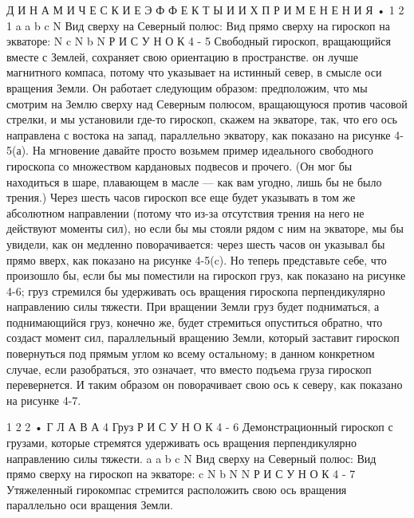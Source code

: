 \documentclass[10pt,oneside]{article}
\begin{document}
Д И Н А М И Ч Е С К И Е  Э Ф Ф Е К Т Ы  И  И Х  П Р И М Е Н Е Н И Я • 1 2 1 a a b c N Вид сверху на Северный полюс: Вид прямо сверху на гироскоп на экваторе: N c N b N Р И С У Н О К  4 - 5 Свободный гироскоп, вращающийся вместе с Землей, сохраняет свою ориентацию в пространстве. он лучше магнитного компаса, потому что указывает на истинный север, в смысле оси вращения Земли. Он работает следующим образом: предположим, что мы смотрим на Землю сверху над Северным полюсом, вращающуюся против часовой стрелки, и мы установили где-то гироскоп, скажем на экваторе, так, что его ось направлена с востока на запад, параллельно экватору, как показано на рисунке 4-5(а). На мгновение давайте просто возьмем пример идеального свободного гироскопа со множеством кардановых подвесов и прочего. (Он мог бы находиться в шаре, плавающем в масле --- как вам угодно, лишь бы не было трения.) Через шесть часов гироскоп все еще будет указывать в том же абсолютном направлении (потому что из-за отсутствия трения на него не действуют моменты сил), но если бы мы стояли рядом с ним на экваторе, мы бы увидели, как он медленно поворачивается: через шесть часов он указывал бы прямо вверх, как показано на рисунке 4-5(c). Но теперь представьте себе, что произошло бы, если бы мы поместили на гироскоп груз, как показано на рисунке 4-6; груз стремился бы удерживать ось вращения гироскопа перпендикулярно направлению силы тяжести. При вращении Земли груз будет подниматься, а поднимающийся груз, конечно же, будет стремиться опуститься обратно, что создаст момент сил, параллельный вращению Земли, который заставит гироскоп повернуться под прямым углом ко всему остальному; в данном конкретном случае, если разобраться, это означает, что вместо подъема груза гироскоп перевернется. И таким образом он поворачивает свою ось к северу, как показано на рисунке 4-7.\par

1 2 2 • Г Л А В А  4 Груз Р И С У Н О К  4 - 6 Демонстрационный гироскоп с грузами, которые стремятся удерживать ось вращения перпендикулярно направлению силы тяжести. a a b c N Вид сверху на Северный полюс: Вид прямо сверху на гироскоп на экваторе: c N b N N Р И С У Н О К  4 - 7 Утяжеленный гирокомпас стремится расположить свою ось вращения параллельно оси вращения Земли.\par
\end{document}

